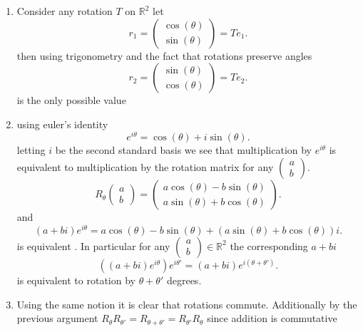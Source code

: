 \documentclass{article}
\begin{document}
    \begin{enumerate}[label = (\alph*)]
        \item Consider any rotation $T$ on $ \mathbb{R}^2$ let
            \[
            r_1 = \begin{pmatrix} \cos(\theta) \\ \sin(\theta) \end{pmatrix}  = Te_1
            .\] 
            then using trigonometry and the fact that rotations preserve angles
            \[
            r_2 = \begin{pmatrix} \sin(\theta) \\ \cos(\theta) \end{pmatrix}  = Te_2
            .\] 
            is the only possible value
        \item 
            using euler's identity
            \[
            e^{i\theta} = \cos(\theta) + i\sin(\theta)
            .\] 
            letting $i$ be the second standard basis we see that multiplication by $e^{i\theta}$ is equivalent
            to multiplication by the rotation matrix for any $\begin{pmatrix} a \\ b \end{pmatrix} $.
            \[
                R_\theta \begin{pmatrix} a \\ b \end{pmatrix}  = \begin{pmatrix} a\cos(\theta) - b\sin(\theta) \\ a\sin(\theta) + b\cos(\theta) \end{pmatrix} 
            .\] 
            and
            \[
                (a+bi)e^{i\theta} = a\cos(\theta) - b\sin(\theta) + (a\sin(\theta) + b\cos(\theta))i
            .\] 
            is equivalent
            . In particular for any $\begin{pmatrix} a \\ b \end{pmatrix} \in \mathbb{R}^2$ the corresponding $a +bi$
            \[
                ((a+bi)e^{i\theta})e^{i\theta'} = (a+bi)e^{i(\theta+\theta')}
            .\] 
            is equivalent to rotation by $\theta + \theta'$ degrees.
        \item Using the same notion it is clear that rotations commute. Additionally by the previous argument
            $R_{\theta}R_{\theta'} = R_{\theta+\theta'} = R_{\theta'}R_{\theta}$ since addition is commutative
    \end{enumerate}
\end{document}
